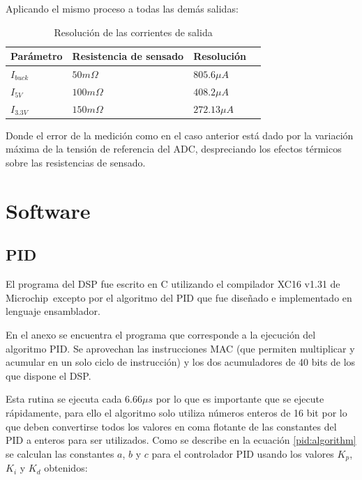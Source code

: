 \documentclass[12pt]{report}
\begin{document}
Aplicando el mismo proceso a todas las demás salidas:

\begin{table}[H]
	\centering
	\begin{tabular}{M{2cm}M{5cm}M{3cm}M{3cm}} \toprule
		Parámetro & Resistencia de sensado & Resolución
		\\ \midrule
		$I_{buck}$ & $50m\Omega$ & $805.6 \mu A$ \\
		$I_{5V}$ & $100m\Omega$ & $408.2 \mu A$ \\
		$I_{3.3V}$ & $150m\Omega$ & $272.13 \mu A$ \\
		\bottomrule
	\end{tabular}
	\caption{Resolución de las corrientes de salida}
\end{table}

Donde el error de la medición como en el caso anterior está dado por la variación máxima de la tensión de referencia del ADC, despreciando los efectos térmicos sobre las resistencias de sensado.

\chapter{Software}

\section{PID}

El programa del DSP fue escrito en C utilizando el compilador XC16 v1.31 de Microchip\textregistered \ excepto por el algoritmo del PID que fue diseñado e implementado en lenguaje ensamblador. 

En el anexo se encuentra el programa que corresponde a la ejecución del algoritmo PID. Se aprovechan las instrucciones MAC (que permiten multiplicar y acumular en un solo ciclo de instrucción) y los dos acumuladores de 40 bits de los que dispone el DSP. 

%	

Esta rutina se ejecuta cada $6.66\mu s$ por lo que es importante que se ejecute rápidamente, para ello el algoritmo solo utiliza números enteros de 16 bit por lo que deben convertirse todos los valores en coma flotante de las constantes del PID a enteros para ser utilizados. Como se describe en la ecuación \ref{pid:algorithm} se calculan las constantes $a$, $b$ y $c$ para el controlador PID usando los valores $K_p$, $K_i$ y $K_d$ obtenidos:
\end{document}

